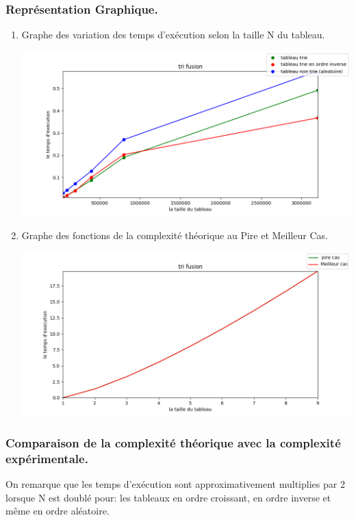 \documentclass[12pt]{article}
\begin{document}
\subsubsection{Représentation Graphique.}
\begin{enumerate}
	\item Graphe des variation des temps d'exécution selon la taille N du tableau.
	
	\includegraphics[width=1\textwidth]{graph/tri_fusion.png}
	
	
	\item Graphe des fonctions de la complexité théorique au Pire et Meilleur Cas.

	\includegraphics[width=1\textwidth]{graph/tri_fusion_teorique.png}	
	
\end{enumerate}

\subsubsection{Comparaison de la complexité théorique avec la complexité expérimentale.}

 On remarque que les temps d'exécution sont approximativement multiplies par 2 lorsque N est doublé pour: \color{blue} les tableaux en ordre croissant, en ordre inverse et même en ordre aléatoire.\\
\color{black}
\end{document}
